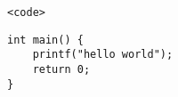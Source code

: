 \begin{verbatim}
<code>
\end{verbatim}

\begin{verbatim}
int main() {
    printf("hello world");
    return 0;
}
\end{verbatim}

\inputminted{c}{a.c}


